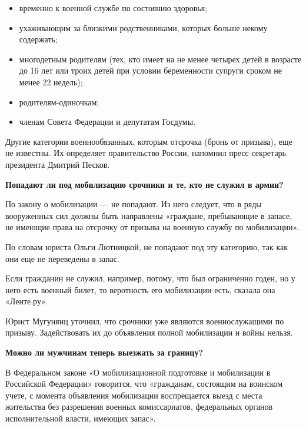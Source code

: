 \begin{itemize}
    \item временно  к военной службе по состоянию здоровья;

    \item ухаживающим за близкими родственниками, которых больше некому содержать;

    \item многодетным родителям (тех, кто имеет на  не менее четырех детей в возрасте до 16 лет или троих детей при условии беременности супруги сроком не менее 22 недель);

    \item родителям-одиночкам;

    \item членам Совета Федерации и депутатам Госдумы.
\end{itemize}

Другие категории военнообязанных, которым  отсрочка (бронь от призыва), еще не известны. Их определяет правительство России, напомнил пресс-секретарь президента Дмитрий Песков.

\textbf{Попадают ли под мобилизацию срочники и те, кто не служил в армии? }

По закону о мобилизации — не попадают. Из него следует, что в ряды вооруженных сил должны быть направлены «граждане, пребывающие в запасе, не имеющие права на отсрочку от призыва на военную службу по мобилизации».

По словам юриста Ольги Лютницкой,  не попадают под эту категорию, так как они еще не переведены в запас.

Если гражданин не служил, например, потому, что был ограниченно годен, но у него есть военный билет, то веротность его мобилизации есть, сказала она «Ленте.ру».

Юрист Мугунянц уточнил, что срочники уже являются военнослужащими по призыву. Задействовать их до объявления полной мобилизации и войны нельзя.

\textbf{Можно ли мужчинам теперь выезжать за границу? }

В Федеральном законе «О мобилизационной подготовке и мобилизации в Российской Федерации» говорится, что «гражданам, состоящим на воинском учете, с момента объявления мобилизации воспрещается выезд с места жительства без разрешения военных комиссариатов, федеральных органов исполнительной власти, имеющих запас».

